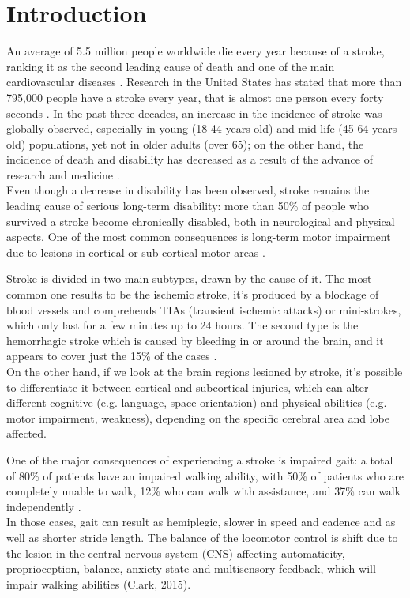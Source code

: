 \chapter{Introduction}
An average of 5.5 million people worldwide die every year because of a stroke, ranking it as the second leading cause of death and one of the main cardiovascular diseases \parencite{Donkor_2018}. Research in the United States has stated that more than 795,000 people have a stroke every year, that is almost one person every forty seconds \parencite{Tsao_2023}. In the past three decades, an increase in the incidence of stroke was globally observed, especially in young (18-44 years old) and mid-life (45-64 years old) populations, yet not in older adults (over 65); on the other hand, the incidence of death and disability has decreased as a result of the advance of research and medicine \parencite{Yahya_2020}. \\
Even though a decrease in disability has been observed, stroke remains the leading cause of serious long-term disability: more than 50\% of people who survived a stroke become chronically disabled, both in neurological and physical aspects. One of the most common consequences is long-term motor impairment due to lesions in cortical or sub-cortical motor areas \parencite{Karthikeyan_2019}. 

Stroke is divided in two main subtypes, drawn by the cause of it. The most common one results to be the ischemic stroke, it's produced by a blockage of blood vessels and comprehends TIAs (transient ischemic attacks) or mini-strokes, which only last for a few minutes up to 24 hours. The second type is the hemorrhagic stroke which is caused by bleeding in or around the brain, and it appears to cover just the 15\% of the cases \parencite{Abdu_2021}. \\
On the other hand, if we look at the brain regions lesioned by stroke, it's possible to differentiate it between cortical and subcortical injuries, which can alter different cognitive (e.g. language, space orientation) and physical abilities (e.g. motor impairment, weakness), depending on the specific cerebral area and lobe affected. 

One of the major consequences of experiencing a stroke is impaired gait: a total of 80\% \parencite{Gomez_2020} of patients have an impaired walking ability, with 50\% of patients who are completely unable to walk, 12\% who can walk with assistance, and 37\% can walk independently \parencite{Balaban_2014}. \\
In those cases, gait can result as hemiplegic, slower in speed and cadence and as well as shorter stride length. The balance of the locomotor control is shift due to the lesion in the central nervous system (CNS) affecting automaticity, proprioception, balance, anxiety state and multisensory feedback, which will impair walking abilities (Clark, 2015). \\

